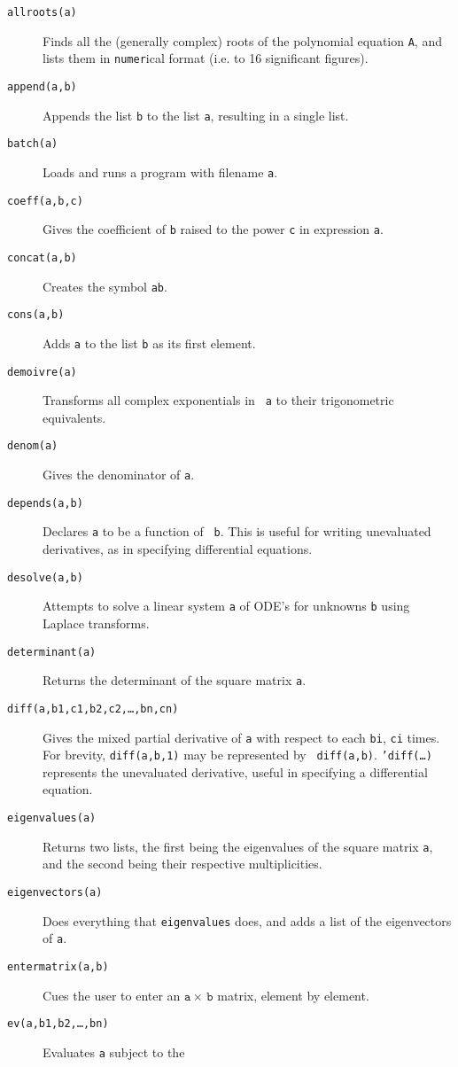 \documentclass[a4paper,12pt]{article}
\begin{document}
\begin{description}
\item[{\tt allroots(a)}] Finds all the (generally complex) roots of
  the polynomial equation {\tt A}, and lists them in {\tt numer}ical
  format (i.e. to 16 significant figures).
\item[{\tt append(a,b)}] Appends the list {\tt b} to the list {\tt a},
  resulting in a single list.
\item[{\tt batch(a)}] Loads and runs a program with filename {\tt a}.
\item[{\tt coeff(a,b,c)}] Gives the coefficient of {\tt b} raised to
  the power {\tt c} in expression {\tt a}.
\item[{\tt concat(a,b)}] Creates the symbol {\tt ab}.
\item[{\tt cons(a,b)}] Adds {\tt a} to the list {\tt b} as its first element.
\item[{\tt demoivre(a)}] Transforms all complex exponentials in {\tt
    a} to their trigonometric equivalents.
\item[{\tt denom(a)}] Gives the denominator of {\tt a}.
\item[{\tt depends(a,b)}] Declares {\tt a} to be a function of {\tt
    b}.  This is useful for writing unevaluated derivatives, as in
  specifying differential equations.
\item[{\tt desolve(a,b)}] Attempts to solve a linear system {\tt a} of
  ODE's for unknowns {\tt b} using Laplace transforms.
\item[{\tt determinant(a)}] Returns the determinant of the square
  matrix {\tt a}.
\item[{\tt diff(a,b1,c1,b2,c2,\ldots,bn,cn)}] Gives the mixed partial
  derivative of {\tt a} with respect to each {\tt bi}, {\tt ci} times.
  For brevity, {\tt diff(a,b,1)} may be represented by {\tt
    diff(a,b)}.  {\tt 'diff(\ldots)} represents the unevaluated
  derivative, useful in specifying a differential equation.
\item[{\tt eigenvalues(a)}] Returns two lists, the first being the
  eigenvalues of the square matrix {\tt a}, and the second being their
  respective multiplicities.
\item[{\tt eigenvectors(a)}] Does everything that {\tt eigenvalues}
  does, and adds a list of the eigenvectors of {\tt a}.
\item[{\tt entermatrix(a,b)}] Cues the user to enter an $\mathtt{a}
  \times\, \mathtt{b}$ matrix, element by element.
\item[{\tt ev(a,b1,b2,\ldots,bn)}] Evaluates {\tt a} subject to the

\end{description}
\end{document}
